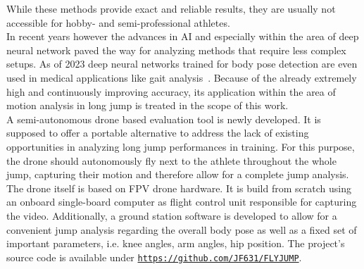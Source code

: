 \noindent While these methods provide exact and reliable results, they are 
usually not accessible for hobby- and semi-professional athletes.\\
In recent years however the advances in \ac{AI} and especially within the area 
of deep neural network paved the way for analyzing methods that require less 
complex setups.
As of 2023 deep neural networks trained for body pose detection are even used 
in medical applications like gait analysis~\cite{mp_gait_analysis}.
Because of the already extremely high and continuously improving accuracy, 
its application within the area of motion analysis in long jump is treated in 
the scope of this work.\\
A semi-autonomous drone based evaluation tool is newly developed.
It is supposed to offer a portable alternative to address the lack of existing
opportunities in analyzing long jump performances in training.
For this purpose, the drone should autonomously fly next to the athlete 
throughout the whole jump, capturing their motion and therefore allow for a 
complete jump analysis.
The drone itself is based on \ac{FPV} drone hardware.
It is build from scratch using an onboard single-board computer as flight 
control unit responsible for capturing the video.
Additionally, a ground station software is developed to allow for a convenient
jump analysis regarding the overall body pose as well as a fixed set of 
important parameters, i.e. knee angles, arm angles, hip position. 
The project's source code is available under \texttt{\url{https://github.com/JF631/FLYJUMP}}.

